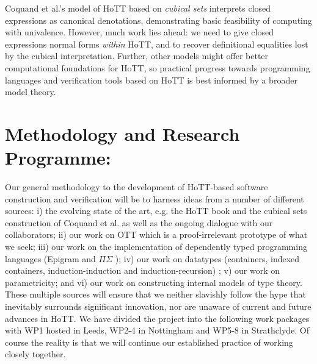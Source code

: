 \documentclass[a4paper,11pt]{article}
\begin{document}

Coquand et al.'s model of HoTT based on \emph{cubical sets} interprets closed expressions
as canonical denotations, demonstrating basic feasibility of computing
with univalence. However, much work lies ahead: we need to give
closed expressions normal forms \emph{within} HoTT, and to recover
definitional equalities lost by the cubical interpretation. Further, other models might
offer better computational foundations for HoTT, so practical progress
towards programming languages and verification tools based on HoTT
is best informed by a broader model theory.










\section{Methodology and Research Programme:}



Our general methodology to the development of HoTT-based software
construction and verification will be to harness ideas from a number
of different sources: i) the evolving state of the art, e.g. the HoTT
book and the cubical sets construction of Coquand et al. as well as
the ongoing dialogue with our collaborators; ii) our work on OTT which
is a proof-irrelevant prototype of what we seek; iii) our work on the
implementation of dependently typed programming languages (Epigram and
$\Pi\Sigma$ \cite{alti:pisigma-new,alti:checking}); iv) our work on datatypes (containers, indexed
containers, induction-induction and induction-recursion) 
\cite{alti:fossacs03,alti:tlca03,alti:icalp04,alti:jpartial,alti:mpc04,alti:cont-tcs,alti:regular,alti:cats07,alti:jcats07,alti:lics09,
alti:catind2}
 ; v) our work
on parametricity; and vi) our work on constructing internal models of
type theory. These multiple sources will ensure that we neither
slavishly follow the hype that inevitably surrounds significant
innovation, nor are unaware of current and future advances in HoTT. We
have divided the project into the following work packages with WP1
hosted in Leeds, WP2-4 in Nottingham and WP5-8 in Strathclyde. Of course
the reality is that we will continue our established practice of
working closely together.
\end{document}
